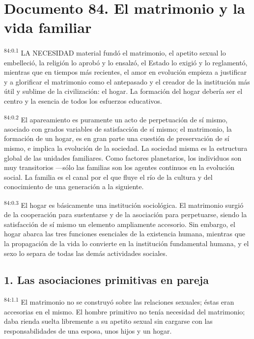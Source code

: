 \chapter{Documento 84. El matrimonio y la vida familiar}
\par
\textsuperscript{84:0.1} LA NECESIDAD material fundó el matrimonio, el apetito sexual lo embelleció, la religión lo aprobó y lo ensalzó, el Estado lo exigió y lo reglamentó, mientras que en tiempos más recientes, el amor en evolución empieza a justificar y a glorificar el matrimonio como el antepasado y el creador de la institución más útil y sublime de la civilización: el hogar. La formación del hogar debería ser el centro y la esencia de todos los esfuerzos educativos.

\par
\textsuperscript{84:0.2} El apareamiento es puramente un acto de perpetuación de sí mismo, asociado con grados variables de satisfacción de sí mismo; el matrimonio, la formación de un hogar, es en gran parte una cuestión de preservación de sí mismo, e implica la evolución de la sociedad. La sociedad misma es la estructura global de las unidades familiares. Como factores planetarios, los individuos son muy transitorios ---sólo las familias son los agentes continuos en la evolución social. La familia es el canal por el que fluye el río de la cultura y del conocimiento de una generación a la siguiente.

\par
\textsuperscript{84:0.3} El hogar es básicamente una institución sociológica. El matrimonio surgió de la cooperación para sustentarse y de la asociación para perpetuarse, siendo la satisfacción de sí mismo un elemento ampliamente accesorio. Sin embargo, el hogar abarca las tres funciones esenciales de la existencia humana, mientras que la propagación de la vida lo convierte en la institución fundamental humana, y el sexo lo separa de todas las demás actividades sociales.

\section*{1. Las asociaciones primitivas en pareja}
\par
\textsuperscript{84:1.1} El matrimonio no se construyó sobre las relaciones sexuales; éstas eran accesorias en el mismo. El hombre primitivo no tenía necesidad del matrimonio; daba rienda suelta libremente a su apetito sexual sin cargarse con las responsabilidades de una esposa, unos hijos y un hogar.

